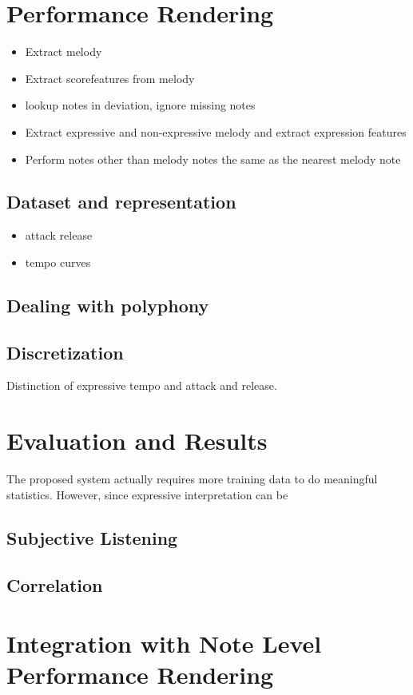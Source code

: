 \documentclass[a4paper,10pt]{article}
\begin{document}
\section{Performance Rendering}
\begin{itemize}
\item Extract melody
\item Extract scorefeatures from melody
\item lookup notes in deviation, ignore missing notes
\item Extract expressive and non-expressive melody and extract expression features
\item Perform notes other than melody notes the same as the nearest melody note
\end{itemize}
\subsection{Dataset and representation}
\begin{itemize}
\item attack release
\item tempo curves
\end{itemize}
\subsection{Dealing with polyphony}
\subsection{Discretization}

Distinction of expressive tempo and attack and release.

\section{Evaluation and Results}
The proposed system actually requires more training data to do meaningful statistics. However, since expressive interpretation can be 
\subsection{Subjective Listening}
\subsection{Correlation}
\section{Integration with Note Level Performance Rendering}
\end{document}
